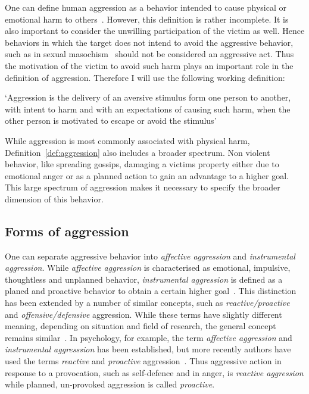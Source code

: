 One can define human aggression as a behavior intended to cause physical or emotional harm to others~\cite{Anderson2002}.
However, this definition is rather incomplete.
It is also important to consider the unwilling participation of the victim as well.
Hence behaviors in which the target does not intend to avoid the aggressive behavior, such as in sexual masochism~\cite{Berkowitz1993,Baumeister1989,Baron2007,Geen2001} should not be considered an aggressive act.
Thus the motivation of the victim to avoid such harm plays an important role in the definition of aggression.  
Therefore I will use the following working definition:
\begin{mydef}[Aggression]\label{def:aggression}
	`Aggression is the delivery of an aversive stimulus form one person to another, with intent to harm and with an expectations of causing such harm, when the other person is motivated to escape or avoid the stimulus'~\cite{Geen2001}
\end{mydef}

While aggression is most commonly associated with physical harm, Definition~\ref{def:aggression} also includes a broader spectrum.
Non violent behavior, like spreading gossips, damaging a victims property either due to emotional anger or as a planned action to gain an advantage to a higher goal.
This large spectrum of aggression makes it necessary to specify the broader dimension of this behavior.

\subsection{Forms of aggression}
\label{sub:forms_of_aggression}

One can separate aggressive behavior into \textit{affective aggression} and \textit{instrumental aggression}.
While \textit{affective aggression} is characterised as emotional, impulsive, thoughtless and unplanned behavior, \textit{instrumental aggression} is defined as a planed and proactive behavior to obtain a certain higher goal~\cite{Berkowitz1993,Geen2001}.
This distinction has been extended by a number of similar concepts, such as \textit{reactive/proactive} and \textit{offensive/defensive} aggression.
While these terms have slightly different meaning, depending on situation and field of research, the general concept remains similar~\cite{Geen2001, Blanchard2005b}.
In psychology, for example, the term \textit{affective aggression} and \textit{instrumental aggresssion} has been established, but more recently authors have used the terms \textit{reactive} and \textit{proactive} aggression~\cite{Geen2001}.
Thus aggressive action in response to a provocation, such as self-defence and in anger, is \textit{reactive aggression} while planned, un-provoked aggression is called \textit{proactive}.

